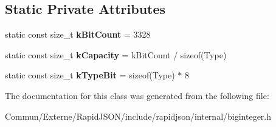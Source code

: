 \subsection*{Static Private Attributes}
\begin{DoxyCompactItemize}
\item 
static const size\+\_\+t {\bfseries k\+Bit\+Count} = 3328\hypertarget{classinternal_1_1_big_integer_a89d6a00e78a914d0b873784539416dc5}{}\label{classinternal_1_1_big_integer_a89d6a00e78a914d0b873784539416dc5}

\item 
static const size\+\_\+t {\bfseries k\+Capacity} = k\+Bit\+Count / sizeof(Type)\hypertarget{classinternal_1_1_big_integer_a8a908718d685b9bd39fb52f2e511b0c6}{}\label{classinternal_1_1_big_integer_a8a908718d685b9bd39fb52f2e511b0c6}

\item 
static const size\+\_\+t {\bfseries k\+Type\+Bit} = sizeof(Type) $\ast$ 8\hypertarget{classinternal_1_1_big_integer_a662666ad4bc9122cb80ba2ac6e88a745}{}\label{classinternal_1_1_big_integer_a662666ad4bc9122cb80ba2ac6e88a745}

\end{DoxyCompactItemize}


The documentation for this class was generated from the following file\+:\begin{DoxyCompactItemize}
\item 
Commun/\+Externe/\+Rapid\+J\+S\+O\+N/include/rapidjson/internal/biginteger.\+h\end{DoxyCompactItemize}
